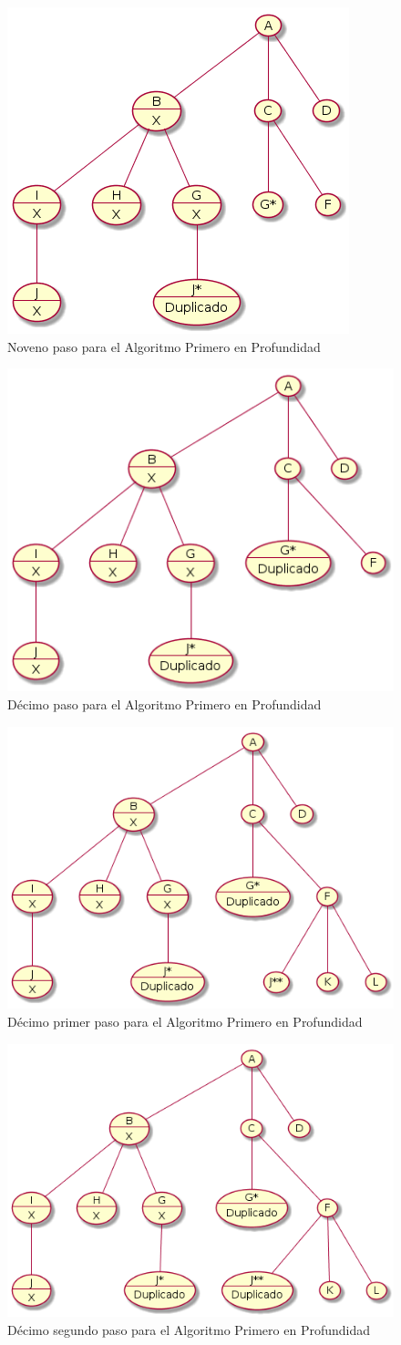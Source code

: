 \documentclass{article}
\begin{document}
\begin{figure}[H]
  \centering
  \includegraphics[width=.4\linewidth]{EJ3/profundidad_008.png}
  \caption{Noveno paso para el Algoritmo Primero en Profundidad}
  \label{gr:g10}
\end{figure}
\begin{figure}[H]
  \centering
  \includegraphics[width=.4\linewidth]{EJ3/profundidad_009.png}
  \caption{D\'ecimo paso para el Algoritmo Primero en Profundidad}
  \label{gr:g11}
\end{figure}
\begin{figure}[H]
  \centering
  \includegraphics[width=.4\linewidth]{EJ3/profundidad_010.png}
  \caption{D\'ecimo primer paso para el Algoritmo Primero en Profundidad}
  \label{gr:g12}
\end{figure}
\begin{figure}[H]
  \centering
  \includegraphics[width=.4\linewidth]{EJ3/profundidad_011.png}
  \caption{D\'ecimo segundo paso para el Algoritmo Primero en Profundidad}
  \label{gr:g13}
\end{figure}
\end{document}

